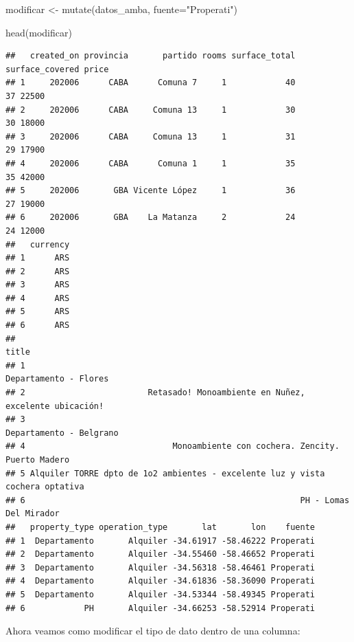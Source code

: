 \documentclass[
  spanish,
]{book}
\newenvironment{Shaded}{\begin{snugshade}}{\end{snugshade}}
\newcommand{\AttributeTok}[1]{\textcolor[rgb]{0.77,0.63,0.00}{#1}}
\newcommand{\FunctionTok}[1]{\textcolor[rgb]{0.00,0.00,0.00}{#1}}
\newcommand{\NormalTok}[1]{#1}
\newcommand{\OtherTok}[1]{\textcolor[rgb]{0.56,0.35,0.01}{#1}}
\newcommand{\SpecialCharTok}[1]{\textcolor[rgb]{0.00,0.00,0.00}{#1}}
\newcommand{\StringTok}[1]{\textcolor[rgb]{0.31,0.60,0.02}{#1}}
\begin{document}
\begin{Shaded}
\begin{Highlighting}[]
\NormalTok{modificar }\OtherTok{\textless{}{-}} \FunctionTok{mutate}\NormalTok{(datos\_amba, }\AttributeTok{fuente=}\StringTok{"Properati"}\NormalTok{)}

\FunctionTok{head}\NormalTok{(modificar)}
\end{Highlighting}
\end{Shaded}

\begin{verbatim}
##   created_on provincia       partido rooms surface_total surface_covered price
## 1     202006      CABA      Comuna 7     1            40              37 22500
## 2     202006      CABA     Comuna 13     1            30              30 18000
## 3     202006      CABA     Comuna 13     1            31              29 17900
## 4     202006      CABA      Comuna 1     1            35              35 42000
## 5     202006       GBA Vicente López     1            36              27 19000
## 6     202006       GBA    La Matanza     2            24              24 12000
##   currency
## 1      ARS
## 2      ARS
## 3      ARS
## 4      ARS
## 5      ARS
## 6      ARS
##                                                                           title
## 1                                                         Departamento - Flores
## 2                         Retasado! Monoambiente en Nuñez, excelente ubicación!
## 3                                                       Departamento - Belgrano
## 4                              Monoambiente con cochera. Zencity. Puerto Madero
## 5 Alquiler TORRE dpto de 1o2 ambientes - excelente luz y vista cochera optativa
## 6                                                        PH - Lomas Del Mirador
##   property_type operation_type       lat       lon    fuente
## 1  Departamento       Alquiler -34.61917 -58.46222 Properati
## 2  Departamento       Alquiler -34.55460 -58.46652 Properati
## 3  Departamento       Alquiler -34.56318 -58.46461 Properati
## 4  Departamento       Alquiler -34.61836 -58.36090 Properati
## 5  Departamento       Alquiler -34.53344 -58.49345 Properati
## 6            PH       Alquiler -34.66253 -58.52914 Properati
\end{verbatim}

Ahora veamos como modificar el tipo de dato dentro de una columna:

\begin{Shaded}
\end{Shaded}
\end{document}
